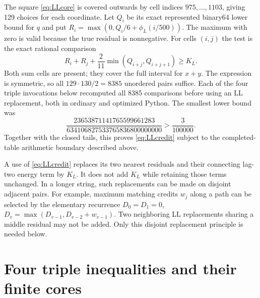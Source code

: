 \documentclass[11pt]{amsart}
\numberwithin{equation}{section}
\begin{document}
The square \eqref{eq:LLcore} is covered outwards by cell indices
$975,\ldots,1103$, giving 129 choices for each coordinate. Let
$Q_i$ be its exact represented binary64 lower bound for $q$ and put
$R_i=\max(0,Q_i/6+\phi_L(i/500))$. The maximum with zero is valid
because the true residual is nonnegative. For cells $(i,j)$ the
test is the exact rational comparison
\begin{equation}\label{eq:LLcell}
 R_i+R_j+\frac2{11}\min(Q_{i+j},Q_{i+j+1})\geq K_L.
\end{equation}
Both sum cells are present; they cover the full interval for $x+y$.
The expression is symmetric, so all $129\cdot130/2=8385$
unordered pairs suffice. Each of the four triple invocations below
recomputed all 8385 comparisons before using an LL replacement, both
in ordinary and optimized Python. The smallest lower bound
was
\begin{equation}\label{eq:LLminimum}
 \frac{23653871141765599661283}{634106827533765836800000000}
       >\frac3{100000}.
\end{equation}
Together with the closed tails, this proves \eqref{eq:LLcredit}
subject to the completed-table arithmetic boundary described above.

A use of \eqref{eq:LLcredit} replaces its two nearest residuals and
their connecting lag-two energy term by $K_L$. It does not add
$K_L$ while retaining those terms unchanged. In a longer string,
such replacements can be made on disjoint adjacent pairs. For
example, maximum matching credits $w_j$ along a path can be
selected by the elementary recurrence
$D_0=D_1=0$, $D_v=\max(D_{v-1},D_{v-2}+w_{v-1})$.
Two neighboring LL replacements sharing a middle residual may not
be added. Only this disjoint replacement principle is needed below.

\section{Four triple inequalities and their finite cores}
\end{document}
